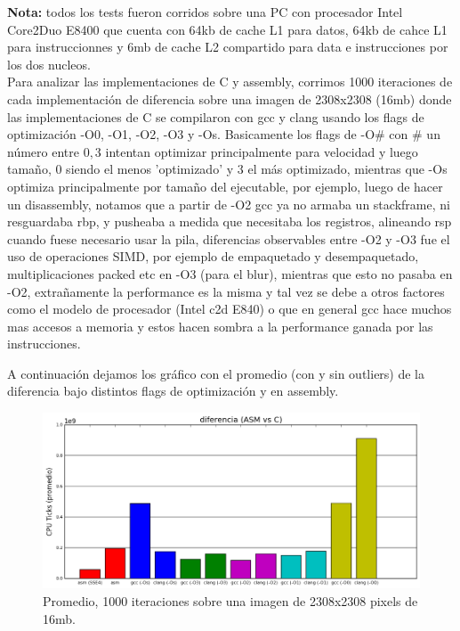 \documentclass[a4paper]{article}
\begin{document}
\noindent \textbf{Nota:} todos los tests fueron corridos sobre una PC con procesador Intel Core2Duo E8400 que cuenta con 64kb de cache L1 para datos, 64kb de cahce L1 para instruccionnes y 6mb de cache L2 compartido para data e instrucciones por los dos nucleos.
\\
\newline
 Para analizar las implementaciones de C y assembly, corrimos 1000 iteraciones de cada implementación de diferencia sobre una imagen de 2308x2308 (16mb) donde las implementaciones de C se compilaron con gcc y clang usando los flags de optimización -O0, -O1, -O2, -O3 y -Os. Basicamente los flags de -O\# con \# un número entre $0,3$ intentan optimizar principalmente para velocidad y luego tamaño, $0$ siendo el menos 'optimizado' y $3$ el más optimizado, mientras que -Os optimiza principalmente por tamaño del ejecutable, por ejemplo, luego de hacer un disassembly, notamos que a partir de -O2 gcc ya no armaba un stackframe, ni resguardaba rbp, y pusheaba a medida que necesitaba los registros, alineando rsp cuando fuese necesario usar la pila, diferencias observables entre -O2 y -O3 fue el uso de operaciones SIMD, por ejemplo de empaquetado y desempaquetado, multiplicaciones packed etc en -O3 (para el blur), mientras que esto no pasaba en -O2, extrañamente la performance es la misma y tal vez se debe a otros factores como el modelo de procesador (Intel c2d E840) o que en general gcc hace muchos mas accesos a memoria y estos hacen sombra a la performance ganada por las instrucciones. \newline


 A continuación dejamos los gráfico con el promedio (con y sin outliers) de la diferencia bajo distintos flags de optimización y en assembly.

 
\begin{figure}[h]
\centerline{\includegraphics[scale=0.71]{imagenes/test_difrencia_ASM_C_PROMEDIO_Os}}
\caption{Promedio, 1000 iteraciones sobre una imagen de 2308x2308 pixels de 16mb.}
\end{figure}
\end{document}
